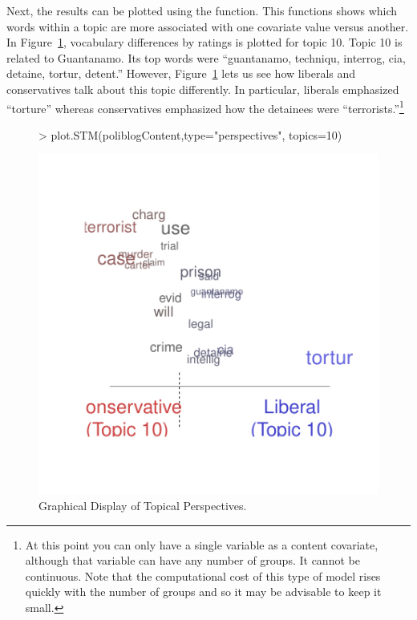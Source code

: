 \documentclass[nojss]{jss}
\begin{document}
\begin{Schunk}
\end{Schunk}

Next, the results can be plotted using the  function.  This functions shows which words within a topic are more associated with one covariate value versus another. In Figure~\ref{fig:perp}, vocabulary differences by ratings is plotted for topic 10. Topic 10 is related to Guantanamo. Its top words were ``guantanamo, techniqu, interrog, cia, detaine, tortur, detent.'' However, Figure~\ref{fig:perp} lets us see how liberals and conservatives talk about this topic differently. In particular, liberals emphasized ``torture'' whereas conservatives emphasized how the detainees were ``terrorists.''\footnote{At this point you can only
 have a single variable as a content covariate, although that variable can have any number of groups. It cannot be continuous. Note that the computational cost of this type of model rises quickly with the number of groups and so it may be advisable to keep it small.}

\begin{figure}[t!]
\begin{center}
\begin{Schunk}
\begin{Sinput}
> plot.STM(poliblogContent,type="perspectives", topics=10)
\end{Sinput}
\end{Schunk}
\includegraphics{stmVignette-017}
\caption{Graphical Display of Topical Perspectives.}
\label{fig:perp}
\end{center}
\end{figure}
\end{document}
